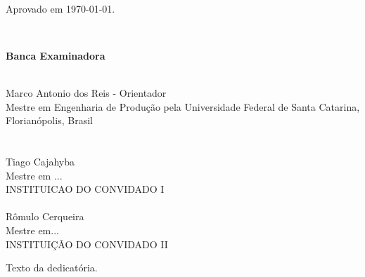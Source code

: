 \documentclass[12pt,oneside,a4paper, chapter=TITLE, section = TITLE, english, brazil]{abntex2}
\begin{document}
\begin{folhadeaprovacao}

% 

\begin{center}
	\imprimirautor
	\vfill
	\imprimirtitulo
\end{center}
\vfill
\imprimirpreambulo \\
\begin{flushright}
	Aprovado em \today .
\end{flushright}
\ \\
\begin{center}
	\textbf{Banca Examinadora}	\\ \ \\
\end{center}
	Marco Antonio dos Reis - Orientador \hrulefill
	\\
	Mestre em Engenharia de Produção pela Universidade Federal de Santa Catarina, Florianópolis, Brasil \\
	\imprimirinstituicao \\ \ \\
	Tiago Cajahyba \hrulefill \\
	Mestre em ... \\
	INSTITUICAO DO CONVIDADO I \\ \ \\
	Rômulo Cerqueira \hrulefill \\
	Mestre em... \\
	INSTITUIÇÃO DO CONVIDADO II	
	\vfill
\begin{center}	
	\imprimirdata
\end{center}
\newpage
\end{folhadeaprovacao}


\begin{dedicatoria}
\vfill 
\vspace*{\fill}
\noindent
\begin{flushright}
	Texto da dedicatória.
\end{flushright}
\newpage 
\end{dedicatoria}

\end{document}
